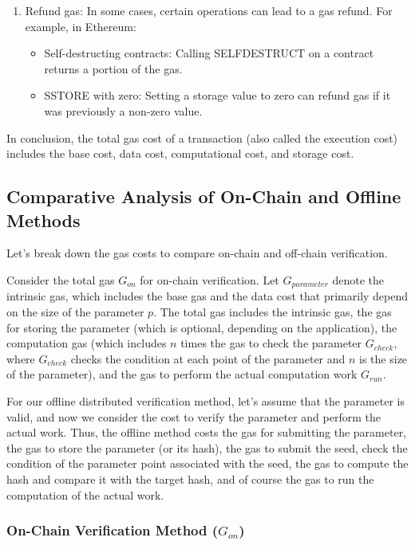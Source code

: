 \documentclass[runningheads]{llncs}
\begin{document}
\begin{enumerate}
\item Refund gas: In some cases, certain operations can lead to a gas refund. For example, in Ethereum:
\begin{itemize}
    \item Self-destructing contracts: Calling SELFDESTRUCT on a contract returns a portion of the gas.
    \item SSTORE with zero: Setting a storage value to zero can refund gas if it was previously a non-zero value.
\end{itemize}

\end{enumerate}

In conclusion, the total gas cost of a transaction (also called the execution cost) includes the base cost, data cost, computational cost, and storage cost.
\subsection{Comparative Analysis of On-Chain and Offline Methods}
Let's break down the gas costs to compare on-chain and off-chain verification.

Consider the total gas $G_{on}$ for on-chain verification. Let $G_{parameter}$ denote the intrinsic gas, which includes the base gas and the data cost that primarily depend on the size of the parameter $p$. The total gas includes the intrinsic gas, the gas for storing the parameter (which is optional, depending on the application), the computation gas (which includes $n$ times the gas to check the parameter $G_{check}$, where $G_{check}$ checks the condition at each point of the parameter and $n$ is the size of the parameter), and the gas to perform the actual computation work $G_{run}$.

For our offline distributed verification method, let's assume that the parameter is valid, and now we consider the cost to verify the parameter and perform the actual work. %
Thus, the offline method costs the gas for submitting the parameter, the gas to store the parameter (or its hash), the gas to submit the seed, check the condition of the parameter point associated with the seed, the gas to compute the hash and compare it with the target hash, and of course the gas to run the computation of the actual work.


\subsubsection{On-Chain Verification Method (\( G_{on} \))}
\end{document}
